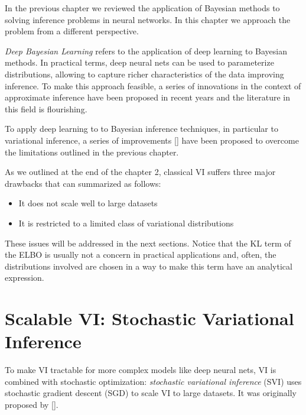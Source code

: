 In the previous chapter we reviewed the application of Bayesian methods to solving inference problems in neural networks. In this chapter we approach the problem from a different perspective. 


\textit{Deep Bayesian Learning} refers to the application of deep learning to Bayesian methods. In practical terms, deep neural nets can be used to parameterize distributions, allowing to capture richer characteristics of the data improving inference. To make this approach feasible, a series of innovations in the context of approximate inference have been proposed in recent years and the literature in this field is flourishing.

To apply deep learning to to Bayesian inference techniques, in particular to variational inference, a series of improvements [\cite{Kingma2013, Rezende2014, Blundell2015, Gal2015, Gal2016, Hoffman2013, Ranganath2014}] have been proposed to overcome the limitations outlined in the previous chapter. 

As we outlined at the end of the chapter 2, classical VI suffers three major drawbacks that can summarized as follows:
\begin{itemize}
    \item It does not scale well to large datasets
    \item It is restricted to a limited class of variational distributions
\end{itemize}
These issues will be addressed in the next sections. Notice that the KL term of the ELBO is usually not a concern in practical applications and, often, the distributions involved are chosen in a way to make this term have an analytical expression.



\section{Scalable VI: Stochastic Variational Inference}
To make VI tractable for more complex models like deep neural nets, VI is combined with stochastic optimization: \textit{stochastic variational inference} (SVI) uses stochastic gradient descent (SGD) to scale VI to large datasets. It was originally proposed by [\cite{Hoffman2013}]. 

